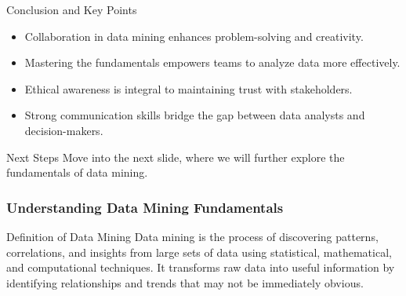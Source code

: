 \documentclass[aspectratio=169]{beamer}
\begin{document}
\begin{frame}[fragile]{Conclusion and Key Points}
    \begin{itemize}
        \item Collaboration in data mining enhances problem-solving and creativity.
        \item Mastering the fundamentals empowers teams to analyze data more effectively.
        \item Ethical awareness is integral to maintaining trust with stakeholders.
        \item Strong communication skills bridge the gap between data analysts and decision-makers.
    \end{itemize}
    
    \begin{block}{Next Steps}
        Move into the next slide, where we will further explore the fundamentals of data mining.
    \end{block}
\end{frame}

\begin{frame}[fragile]
    \frametitle{Understanding Data Mining Fundamentals}
    \begin{block}{Definition of Data Mining}
        Data mining is the process of discovering patterns, correlations, and insights from large sets of data using statistical, mathematical, and computational techniques. It transforms raw data into useful information by identifying relationships and trends that may not be immediately obvious.
    \end{block}
\end{frame}
\end{document}
